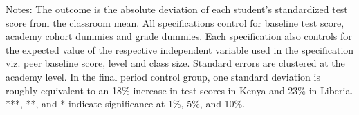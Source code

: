 \begin{center}
\begin{footnotesize}
\begin{threeparttable}
\begin{tablenotes}
\item Notes: The outcome is the absolute deviation of each student's standardized test score from the classroom mean. All specifications control for baseline test score, academy cohort dummies and grade dummies. Each specification also controls for the expected value of the respective independent variable used in the specification viz. peer baseline score, level and class size. Standard errors are clustered at the academy level. In the final period control group, one standard deviation is roughly equivalent to an 18\% increase in test scores in Kenya and 23\% in Liberia. ***, **, and * indicate significance at 1\%, 5\%, and 10\%.\end{tablenotes}
\end{threeparttable}
\end{footnotesize}
\end{center}
\clearpage
